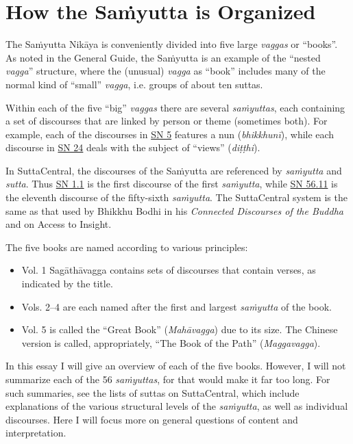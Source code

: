 \documentclass[12pt,openany]{book}%
\begin{document}
\section*{How the \textsanskrit{Saṁyutta} is Organized}

The \textsanskrit{Saṁyutta} \textsanskrit{Nikāya} is conveniently divided into five large \textit{vaggas} or “books”. As noted in the General Guide, the \textsanskrit{Saṁyutta} is an example of the “nested \textit{vagga}” structure, where the (unusual) \textit{vagga} as “book” includes many of the normal kind of “small” \textit{vagga}, i.e. groups of about ten suttas.

Within each of the five “big” \textit{vaggas} there are several \textit{\textsanskrit{saṁyuttas}}, each containing a set of discourses that are linked by person or theme (sometimes both). For example, each of the discourses in \href{https://suttacentral.net/sn5}{SN 5} features a nun (\textit{\textsanskrit{bhikkhunī}}), while each discourse in \href{https://suttacentral.net/sn24}{SN 24} deals with the subject of “views” (\textit{\textsanskrit{diṭṭhi}}).

In SuttaCentral, the discourses of the \textsanskrit{Saṁyutta} are referenced by \textit{\textsanskrit{saṁyutta}} and \textit{sutta}. Thus \href{https://suttacentral.net/sn1.1}{SN 1.1} is the first discourse of the first \textit{\textsanskrit{saṁyutta}}, while \href{https://suttacentral.net/sn56.11}{SN 56.11} is the eleventh discourse of the fifty-sixth \textit{\textsanskrit{saṁyutta}}. The SuttaCentral system is the same as that used by Bhikkhu Bodhi in his \textit{Connected Discourses of the Buddha} and on Access to Insight.

The five books are named according to various principles:

\begin{itemize}%
\item Vol. 1 \textsanskrit{Sagāthāvagga} contains sets of discourses that contain verses, as indicated by the title.%
\item Vols. 2–4 are each named after the first and largest \textit{\textsanskrit{saṁyutta}} of the book.%
\item Vol. 5 is called the “Great Book” (\textit{\textsanskrit{Mahāvagga}}) due to its size. The Chinese version is called, appropriately, “The Book of the Path” (\textit{Maggavagga}).%
\end{itemize}

In this essay I will give an overview of each of the five books. However, I will not summarize each of the 56 \textit{\textsanskrit{saṁyuttas}}, for that would make it far too long. For such summaries, see the lists of suttas on SuttaCentral, which include explanations of the various structural levels of the \textit{\textsanskrit{saṁyutta}}, as well as individual discourses. Here I will focus more on general questions of content and interpretation.
\end{document}
